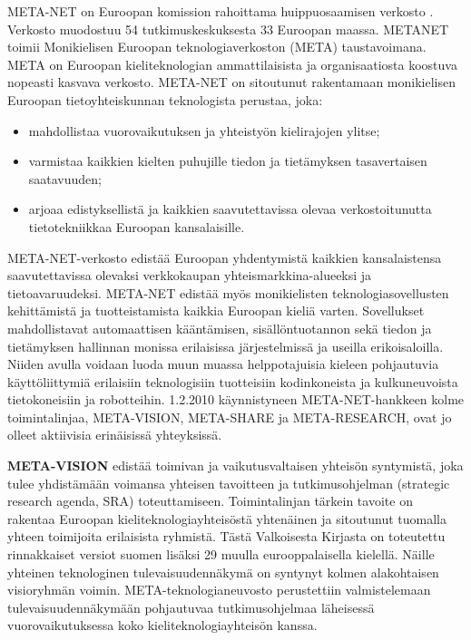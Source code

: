 \cleardoublepage
\begin{multicols}{2}

META-NET on Euroopan komission rahoittama huippuosaamisen verkosto \cite{rehm2011}. Verkosto muodostuu 54 tutkimuskeskuksesta 33 Euroopan maassa. METANET toimii Monikielisen Euroopan teknologiaverkoston (META) taustavoimana. META on Euroopan kieliteknologian ammattilaisista ja organisaatiosta koostuva nopeasti kasvava verkosto. META-NET on sitoutunut rakentamaan monikielisen Euroopan tietoyhteiskunnan teknologista perustaa, joka:

\begin{itemize}
\item mahdollistaa vuorovaikutuksen ja yhteistyön kielirajojen ylitse;
\item varmistaa kaikkien kielten puhujille tiedon ja tietämyksen tasavertaisen saatavuuden;
\item arjoaa edistyksellistä ja kaikkien saavutettavissa olevaa verkostoitunutta tietotekniikkaa Euroopan kansalaisille.
\end{itemize}

META-NET-verkosto edistää Euroopan yhdentymistä kaikkien kansalaistensa saavutettavissa olevaksi verkkokaupan yhteismarkkina-alueeksi ja tietoavaruudeksi. META-NET edistää myös monikielisten teknologiasovellusten kehittämistä ja tuotteistamista kaikkia Euroopan kieliä varten. Sovellukset mahdollistavat automaattisen kääntämisen, sisällöntuotannon sekä tiedon ja tietämyksen hallinnan monissa erilaisissa järjestelmissä ja useilla erikoisaloilla. Niiden avulla voidaan luoda muun muassa helppotajuisia kieleen pohjautuvia käyttöliittymiä erilaisiin teknologisiin tuotteisiin kodinkoneista ja kulkuneuvoista tietokoneisiin ja robotteihin. 
1.2.2010 käynnistyneen META-NET-hankkeen kolme toimintalinjaa, META-VISION, META-SHARE ja META-RESEARCH, ovat jo olleet aktiivisia erinäisissä yhteyksissä.

\textbf{META-VISION} edistää toimivan ja vaikutusvaltaisen yhteisön syntymistä, joka tulee yhdistämään voimansa yhteisen tavoitteen ja tutkimusohjelman (strategic research agenda, SRA) toteuttamiseen. Toimintalinjan tärkein tavoite on rakentaa Euroopan kieliteknologiayhteisöstä yhtenäinen ja sitoutunut tuomalla yhteen toimijoita erilaisista ryhmistä. Tästä Valkoisesta Kirjasta on toteutettu rinnakkaiset versiot suomen lisäksi 29 muulla eurooppalaisella kielellä. Näille yhteinen teknologinen tulevaisuudennäkymä on syntynyt kolmen alakohtaisen visioryhmän voimin. META-teknologianeuvosto perustettiin valmistelemaan tulevaisuudennäkymään pohjautuvaa tutkimusohjelmaa läheisessä vuorovaikutuksessa koko kieliteknologiayhteisön kanssa.


\end{multicols}
